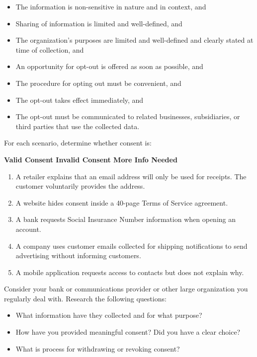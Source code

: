 \begin{itemize}
   \item The information is non-sensitive in nature and in context, and
   \item Sharing of information is limited and well-defined, and
   \item The organization's purposes are limited and well-defined and clearly stated at time of collection, and
   \item An opportunity for opt-out is offered as soon as possible, and
   \item The procedure for opting out must be convenient, and
   \item The opt-out takes effect immediately, and
   \item The opt-out must be communicated to related businesses, subsidiaries, or third parties that use the collected data.
\end{itemize}

 
\begin{exerciseboxpaper}
For each scenario, determine whether consent is:\\

\begin{center}
\textbf{Valid Consent \quad Invalid Consent \quad More Info Needed}
\end{center}
\bigskip
\begin{enumerate}
\item A retailer explains that an email address will only be used for receipts. The customer voluntarily provides the address.
\item A website hides consent inside a 40-page Terms of Service agreement.
\item A bank requests Social Insurance Number information when opening an account.
\item A company uses customer emails collected for shipping notifications to send advertising without informing customers.
\item A mobile application requests access to contacts but does not explain why.
\end{enumerate}
\end{exerciseboxpaper}

\begin{exerciseboxcomputer}

Consider your bank or communications provider or other large organization you regularly deal with. Research the following questions:
\begin{itemize}
  \item What information have they collected and for what purpose?
  \item How have you provided meaningful consent? Did you have a clear choice?
  \item What is process for withdrawing or revoking consent?
\end{itemize}
\end{exerciseboxcomputer}

